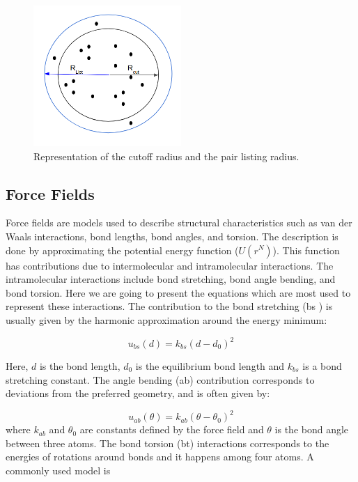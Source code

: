  \begin{figure}
	\centering
	\includegraphics[width=0.5\textwidth]{Figures/pairlist}
	\caption{Representation of the cutoff radius and the pair listing radius.}
	\label{fig:pairlist}
\end{figure}
\FloatBarrier
\subsection{Force Fields }
Force fields are models used to describe structural characteristics such as van der Waals interactions, bond lengths, bond angles, and torsion. The description is done by approximating the potential energy function ($U(r^N)$). This function has contributions due to intermolecular and intramolecular interactions. The intramolecular interactions include bond stretching, bond angle bending, and bond torsion. Here we are going to present the equations which are most used to represent these interactions. The contribution to the bond stretching (bs ) is usually given by the harmonic approximation around the energy minimum:

\begin{equation}
u_{bs}(d) = k_{bs} (d - d_{0})^2
\end{equation}

Here, $d$ is the bond length, $d_{0}$ is the equilibrium bond length and $k_{bs}$ is a bond stretching constant. The angle bending (ab) contribution corresponds to deviations from the preferred geometry, and is often given by:

\begin{equation}
u_{ab}(\theta) = k_{ab} (\theta - \theta _{0})^2
\end{equation}
where $k_{ab}$ and $\theta _{0}$ are constants defined by the force field and $\theta$ is the bond angle between three atoms.  The bond torsion (bt) interactions corresponds to the energies of rotations around bonds and it happens among four atoms. A commonly used model is

